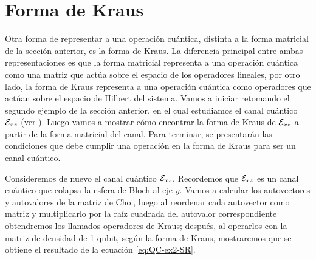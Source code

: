 \section{Forma de Kraus} %

Otra forma de representar a una operación cuántica, distinta a la
forma matricial 
 de la sección anterior, es la forma de Kraus. 
La diferencia principal entre ambas representaciones 
es que la forma matricial
representa a una operación cuántica como una matriz que 
actúa sobre el espacio de los operadores lineales, por otro lado,
la forma de Kraus representa a una operación cuántica 
como operadores que actúan sobre el espacio de 
Hilbert del sistema. Vamos a iniciar retomando el segundo 
ejemplo de la sección anterior, en el cual estudiamos 
el canal cuántico $\mathcal{E}_{xz}$ (ver ).
Luego vamos a mostrar cómo encontrar la forma de Kraus de $\mathcal{E}_{xz}$ 
a partir de la forma matricial del canal.
Para terminar, se presentarán las condiciones 
que debe cumplir una operación en la forma de Kraus para
ser un canal cuántico.

Consideremos de nuevo el canal cuántico $\mathcal{E}_{xz}$.
Recordemos que $\mathcal{E}_{xz}$ es un canal cuántico
que colapsa la esfera de Bloch al eje $y$. 
Vamos a calcular los autovectores y autovalores de la 
matriz de Choi, luego al reordenar
cada autovector como matriz y multiplicarlo por la raíz cuadrada
del autovalor correspondiente obtendremos los llamados 
operadores de Kraus; después, al operarlos con la matriz 
de densidad de 1 qubit, según 
la forma de Kraus, mostraremos que se obtiene el 
resultado de la ecuación \eqref{eq:QC-ex2-SR}.

